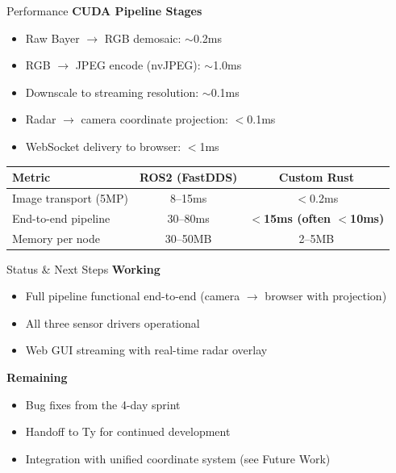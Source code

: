 \documentclass[10pt, aspectratio=169]{beamer}
\begin{document}
\begin{frame}{Performance}
  \textbf{CUDA Pipeline Stages}
  \begin{itemize}
    \item Raw Bayer $\rightarrow$ RGB demosaic: $\sim$0.2ms
    \item RGB $\rightarrow$ JPEG encode (nvJPEG): $\sim$1.0ms
    \item Downscale to streaming resolution: $\sim$0.1ms
    \item Radar $\rightarrow$ camera coordinate projection: $<$0.1ms
    \item WebSocket delivery to browser: $<$1ms
  \end{itemize}

  \vspace{0.5em}
  \begin{table}
    \centering
    \begin{tabular}{lcc}
      \toprule
      \textbf{Metric} & \textbf{ROS2 (FastDDS)} & \textbf{Custom Rust} \\
      \midrule
      Image transport (5MP)    & 8--15ms   & $<$0.2ms \\
      End-to-end pipeline      & 30--80ms  & \textbf{$<$15ms (often $<$10ms)} \\
      Memory per node          & 30--50MB  & 2--5MB \\
      \bottomrule
    \end{tabular}
  \end{table}
\end{frame}

\begin{frame}{Status \& Next Steps}
  \textbf{Working}
  \begin{itemize}
    \item Full pipeline functional end-to-end (camera $\rightarrow$ browser with projection)
    \item All three sensor drivers operational
    \item Web GUI streaming with real-time radar overlay
  \end{itemize}

  \vspace{0.5em}
  \textbf{Remaining}
  \begin{itemize}
    \item Bug fixes from the 4-day sprint
    \item Handoff to Ty for continued development
    \item Integration with unified coordinate system (see Future Work)
  \end{itemize}
\end{frame}
\end{document}
